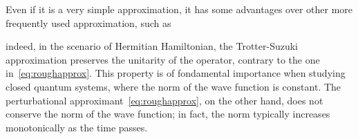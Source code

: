 Even if it is a very simple approximation, it has some advantages over other more frequently used approximation, such as

indeed, in the scenario of Hermitian Hamiltonian, the Trotter-Suzuki approximation preserves the unitarity of the operator, contrary to the one in~\eqref{eq:roughapprox}. This property is of fondamental importance when studying closed quantum systems, where the norm of the wave function is constant. The perturbational approximant~\eqref{eq:roughapprox}, on the other hand, does not conserve the norm of the wave function; in fact, the norm typically increases monotonically as the time passes.